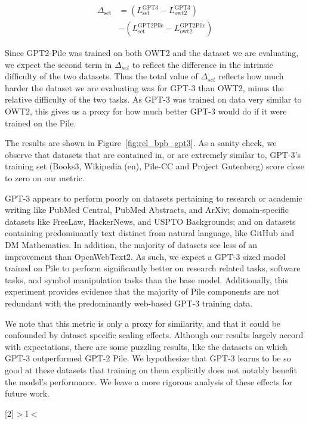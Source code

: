 \begin{align*}
    \Delta_{\mathrm{set}} &= \left(L^{\mathrm{GPT3}}_{\mathrm{set}} - L^{\mathrm{GPT3}}_{\mathrm{owt2}}\right)\\
    & - \left(L^{\mathrm{GPT2Pile}}_{\mathrm{set}} - L^{\mathrm{GPT2Pile}}_{\mathrm{owt2}}\right)
\end{align*}

Since GPT2-Pile was trained on both OWT2 and the dataset we are evaluating, we expect the second term in $\Delta_{set}$ to reflect the difference in the intrinsic difficulty of the two datasets. Thus the total value of $\Delta_{set}$ reflects how much harder the dataset we are evaluating was for GPT-3 than OWT2, minus the relative difficulty of the two tasks. As GPT-3 was trained on data very similar to OWT2, this gives us a proxy for how much better GPT-3 would do if it were trained on the Pile.

The results are shown in Figure~\ref{fig:rel_bpb_gpt3}. As a sanity check, we observe that datasets that are contained in, or are extremely similar to, GPT-3's training set (Books3, Wikipedia (en), Pile-CC and Project Gutenberg) score close to zero on our metric.

GPT-3 appears to perform poorly on datasets pertaining to research or academic writing like PubMed Central, PubMed Abstracts, and ArXiv; domain-specific datasets like FreeLaw, HackerNews, and USPTO Backgrounds; and on datasets containing predominantly text distinct from natural language, like GitHub and DM Mathematics. In addition, the majority of datasets see less of an improvement than OpenWebText2. As such, we expect a GPT-3 sized model trained on Pile to perform significantly better on research related tasks, software tasks, and symbol manipulation tasks than the base model. Additionally, this experiment provides evidence that the majority of Pile components are not redundant with the predominantly web-based GPT-3 training data.

We note that this metric is only a proxy for similarity, and that it could be confounded by dataset specific scaling effects. Although our results largely accord with expectations, there are some puzzling results, like the datasets on which GPT-3 outperformed GPT-2 Pile. We hypothesize that GPT-3 learns to be so good at these datasets that training on them explicitly does not notably benefit the model's performance. We leave a more rigorous analysis of these effects for future work.

\newcolumntype{R}[2]{
    >{\bgroup}
    l
    <{\egroup}
}
\newcommand*\rot{\multicolumn{1}{R{45}{1em}}}

